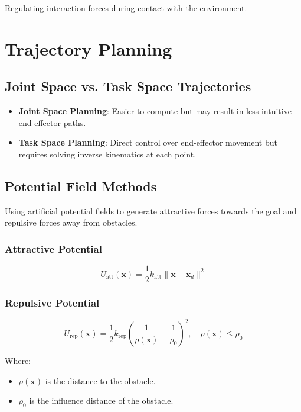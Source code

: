 \documentclass{article}
\begin{document}
Regulating interaction forces during contact with the environment.

\section{Trajectory Planning}

\subsection{Joint Space vs. Task Space Trajectories}

\begin{itemize}
    \item \textbf{Joint Space Planning}: Easier to compute but may result in less intuitive end-effector paths.
    \item \textbf{Task Space Planning}: Direct control over end-effector movement but requires solving inverse kinematics at each point.
\end{itemize}

\subsection{Potential Field Methods}

Using artificial potential fields to generate attractive forces towards the goal and repulsive forces away from obstacles.

\subsubsection{Attractive Potential}

$$
U_{\text{att}}(\mathbf{x}) = \frac{1}{2} k_{\text{att}} \| \mathbf{x} - \mathbf{x}_d \|^2
$$

\subsubsection{Repulsive Potential}

$$
U_{\text{rep}}(\mathbf{x}) = \frac{1}{2} k_{\text{rep}} \left( \frac{1}{\rho(\mathbf{x})} - \frac{1}{\rho_0} \right)^2, \quad \rho(\mathbf{x}) \leq \rho_0
$$

Where:
\begin{itemize}
    \item $\rho(\mathbf{x})$ is the distance to the obstacle.
    \item $\rho_0$ is the influence distance of the obstacle.
\end{itemize}
\end{document}
